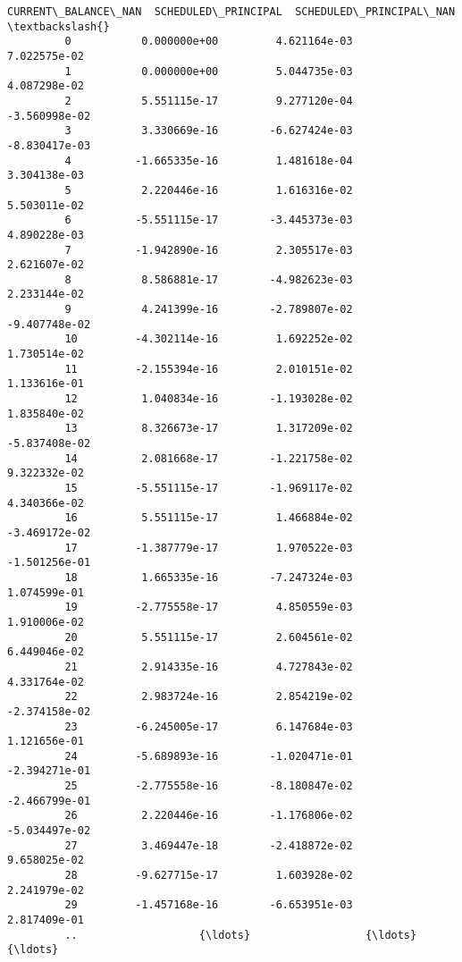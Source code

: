 \documentclass[11pt]{article}
\begin{document}
\begin{Verbatim}[commandchars=\\\{\}]
              CURRENT\_BALANCE\_NAN  SCHEDULED\_PRINCIPAL  SCHEDULED\_PRINCIPAL\_NAN  \textbackslash{}
         0           0.000000e+00         4.621164e-03             7.022575e-02   
         1           0.000000e+00         5.044735e-03             4.087298e-02   
         2           5.551115e-17         9.277120e-04            -3.560998e-02   
         3           3.330669e-16        -6.627424e-03            -8.830417e-03   
         4          -1.665335e-16         1.481618e-04             3.304138e-03   
         5           2.220446e-16         1.616316e-02             5.503011e-02   
         6          -5.551115e-17        -3.445373e-03             4.890228e-03   
         7          -1.942890e-16         2.305517e-03             2.621607e-02   
         8           8.586881e-17        -4.982623e-03             2.233144e-02   
         9           4.241399e-16        -2.789807e-02            -9.407748e-02   
         10         -4.302114e-16         1.692252e-02             1.730514e-02   
         11         -2.155394e-16         2.010151e-02             1.133616e-01   
         12          1.040834e-16        -1.193028e-02             1.835840e-02   
         13          8.326673e-17         1.317209e-02            -5.837408e-02   
         14          2.081668e-17        -1.221758e-02             9.322332e-02   
         15         -5.551115e-17        -1.969117e-02             4.340366e-02   
         16          5.551115e-17         1.466884e-02            -3.469172e-02   
         17         -1.387779e-17         1.970522e-03            -1.501256e-01   
         18          1.665335e-16        -7.247324e-03             1.074599e-01   
         19         -2.775558e-17         4.850559e-03             1.910006e-02   
         20          5.551115e-17         2.604561e-02             6.449046e-02   
         21          2.914335e-16         4.727843e-02             4.331764e-02   
         22          2.983724e-16         2.854219e-02            -2.374158e-02   
         23         -6.245005e-17         6.147684e-03             1.121656e-01   
         24         -5.689893e-16        -1.020471e-01            -2.394271e-01   
         25         -2.775558e-16        -8.180847e-02            -2.466799e-01   
         26          2.220446e-16        -1.176806e-02            -5.034497e-02   
         27          3.469447e-18        -2.418872e-02             9.658025e-02   
         28         -9.627715e-17         1.603928e-02             2.241979e-02   
         29         -1.457168e-16        -6.653951e-03             2.817409e-01   
         ..                   {\ldots}                  {\ldots}                      {\ldots}   

\end{Verbatim}
\end{document}
